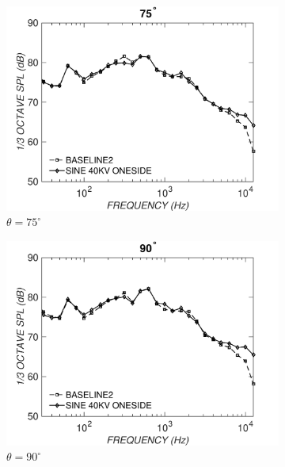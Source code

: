 \begin{figure}
\begin{subfigure}{0.32\textwidth}
\includegraphics[width=\linewidth]{figures/octave752}
\caption{$\theta=75^\circ$}
\label{fig:octave752}
\end{subfigure}%
\hspace*{\fill} %
\begin{subfigure}{0.32\textwidth}
\includegraphics[width=\linewidth]{figures/octave902}
\caption{$\theta=90^\circ$}
\label{fig:octave902}
\end{subfigure}
\hspace*{\fill} %
\begin{subfigure}{0.32\textwidth}

\end{subfigure}
\end{figure}
